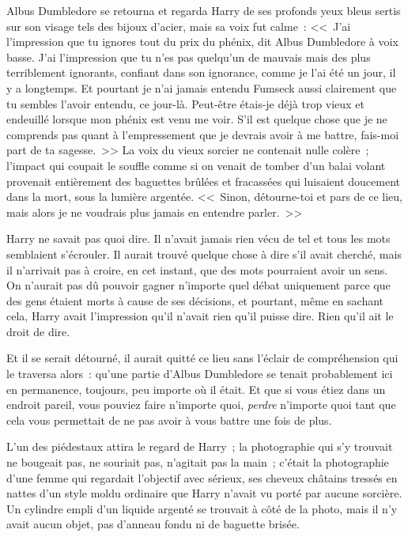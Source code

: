 Albus Dumbledore se retourna et regarda Harry de ses profonds yeux bleus sertis sur son visage tels des bijoux d'acier, mais sa voix fut calme~: <<~J'ai l'impression que tu ignores tout du prix du phénix, dit Albus Dumbledore à voix basse. J'ai l'impression que tu n'es pas quelqu'un de mauvais mais des plus terriblement ignorants, confiant dans son ignorance, comme je l'ai été un jour, il y a longtemps. Et pourtant je n'ai jamais entendu Fumseck aussi clairement que tu sembles l'avoir entendu, ce jour-là. Peut-être étais-je déjà trop vieux et endeuillé lorsque mon phénix est venu me voir. S'il est quelque chose que je ne comprends pas quant à l'empressement que je devrais avoir à me battre, fais-moi part de ta sagesse.~>> La voix du vieux sorcier ne contenait nulle colère~; l'impact qui coupait le souffle comme si on venait de tomber d'un balai volant provenait entièrement des baguettes brûlées et fracassées qui luisaient doucement dans la mort, sous la lumière argentée. <<~Sinon, détourne-toi et pars de ce lieu, mais alors je ne voudrais plus jamais en entendre parler.~>>

Harry ne savait pas quoi dire. Il n'avait jamais rien vécu de tel et tous les mots semblaient s'écrouler. Il aurait trouvé quelque chose à dire s'il avait cherché, mais il n'arrivait pas à croire, en cet instant, que des mots pourraient avoir un sens. On n'aurait pas dû pouvoir gagner n'importe quel débat uniquement parce que des gens étaient morts à cause de ses décisions, et pourtant, même en sachant cela, Harry avait l'impression qu'il n'avait rien qu'il puisse dire. Rien qu'il ait le droit de dire.

Et il se serait détourné, il aurait quitté ce lieu sans l'éclair de compréhension qui le traversa alors~: qu'une partie d'Albus Dumbledore se tenait probablement ici en permanence, toujours, peu importe où il était. Et que si vous étiez dans un endroit pareil, vous pouviez faire n'importe quoi, \emph{perdre} n'importe quoi tant que cela vous permettait de ne pas avoir à vous battre une fois de plus.

L'un des piédestaux attira le regard de Harry~; la photographie qui s'y trouvait ne bougeait pas, ne souriait pas, n'agitait pas la main~; c'était la photographie d'une femme qui regardait l'objectif avec sérieux, ses cheveux châtains tressés en nattes d'un style moldu ordinaire que Harry n'avait vu porté par aucune sorcière. Un cylindre empli d'un liquide argenté se trouvait à côté de la photo, mais il n'y avait aucun objet, pas d'anneau fondu ni de baguette brisée.

